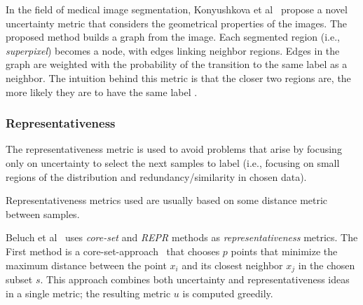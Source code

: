     In the field of medical image segmentation, Konyushkova et al~\cite{konyushkova2019geometry} propose a novel uncertainty metric that considers the geometrical properties of the images.
    The proposed method builds a graph from the image. Each segmented region (i.e., \emph{superpixel}) becomes a node, with edges linking neighbor regions. Edges in the graph are weighted with the probability of the transition to the same label as a neighbor. The intuition behind this metric is that the closer two regions are, the more likely they are to have the same label \cite{konyushkova2019geometry}.
    


    
    \subsubsection*{Representativeness}
    The representativeness metric is used to avoid problems that arise by focusing only on uncertainty to select the next samples to label (i.e., focusing on small regions of the distribution and redundancy/similarity in chosen data).
    
    Representativeness metrics used are usually based on some distance metric between samples.
    
    Beluch et al~\cite{beluch2018power} uses \emph{core-set} and \emph{REPR} methods as \emph{representativeness} metrics.
    The First method is a core-set-approach~\cite{sener2017geometric} that chooses $p$ points that minimize the maximum distance between the point $x_i$ and its closest neighbor $x_j$ in the chosen subset $s$. This approach combines both uncertainty and representativeness ideas in a single metric; the resulting metric $u$ is computed greedily.

